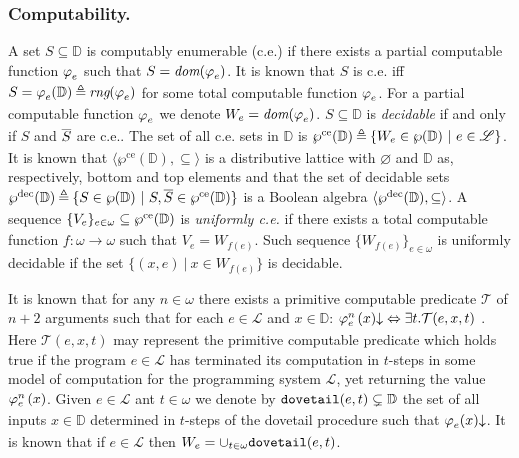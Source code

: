 \documentclass[runningheads]{llncs}
\def\ok#1{\mbox{\raisebox{0ex}[1ex][1ex]{$#1$}}}
\def\re{c.e.}
\def\wpre{\wp^{\text{ce}}}
\def\wprec{\wp^{\text{dec}}}
\def\dovetl{{\tt dovetail}}
\newcommand{\ccL}{\mathscr{L}}
\newcommand{\Domain}{\mathbb{D}}
\newcommand{\NF}{{\mathcal{T}}}
\newcommand{\pfunction}[3]{\ok{\varphi^{#2\, #3}_{#1}}}
\newcommand{\ptfunction}[5]{\ok{[\varphi^{#2 #3}_{#1}(#4)]^{#5}}}
\newcommand{\compl}[1]{\ok{\overline{#1}}}
\newcommand{\ra}{\rightarrow}
\newcommand{\range}{\textit{rng}}
\newcommand{\dom}{\textit{dom}}
\newcommand{\ud}{\ok{\:\triangleq\:}}
\def\ok#1{\mbox{\raisebox{0ex}[1ex][1ex]{$#1$}}}
\newcommand{\sset}[2]{\{#1  ~|~ #2\}}
\newcommand{\nat}{\omega}
\def\tuple#1{\langle #1 \rangle}
\begin{document}
\subsubsection{Computability.}
A set $S\subseteq \Domain$ is computably enumerable (\re) if there exists a partial computable function $\pfunction{e}{}{}$ such that $S=\dom(\pfunction{e}{}{})$. It is known that $S$ is {\re} iff $S = \pfunction{e}{}{}(\Domain)\ud\range(\pfunction{e}{}{})$ for some total computable function $\pfunction{e}{}{}$.
For a partial computable function $\pfunction{e}{}{}$ we denote $W_e = \dom(\pfunction{e}{}{})$. $S\subseteq \Domain$ is {\em decidable} if and only if $S$ and $\compl{S}$ are \re.
The set of all {\re} sets in $\Domain$ is $\wpre(\Domain)\ud \sset{W_e \in \wp(\Domain)}{e\in\ccL}$. 
It is known \cite[Union Theorem~1.9, Chapter~II]{soare} 
that $\tuple{\wpre(\Domain),\subseteq}$ is 
a distributive lattice with $\varnothing$ and $\Domain$ as, respectively, bottom and top elements and that
the set of decidable sets $\wprec(\Domain) \ud \sset{S\in \wp(\Domain)}{
S, \compl{S}\in \wpre(\Domain)}$
is a Boolean algebra $\ok{\tuple{\wprec(\Domain),\subseteq}}$. 
A sequence $\ok{\{V_e\}_{e\in\nat}\subseteq\wpre(\Domain)}$ is {\em uniformly {\re}} if there exists a total computable function $f:\nat\ra\nat$ such that $V_e=W_{f(e)}$. Such sequence $\{W_{f(e)}\}_{e\in\nat}$ is uniformly decidable if the set $\sset{(x,e)}{x\in W_{f(e)}}$ is decidable.

\smallskip

It is known that for any $n\in\nat$ there exists a primitive computable predicate $\NF$ of $n+2$ arguments such that 
for each $e\in\ccL$ and $x\in\Domain$: $\pfunction{e}{n}{}(x){\downarrow} \Leftrightarrow \exists t.\NF(e,x,t)$ \cite{kleene38}. Here $\NF(e,x,t)$ may represent the primitive computable predicate which holds true if the program $e\in\ccL$ has terminated its computation in $t$-steps in some model of computation for the programming system $\ccL$, yet returning the value $\pfunction{e}{n}{}(x)$. 
Given $e\in\ccL$ ant $t\in\omega$ we denote by $\dovetl(e,t)\subsetneq\Domain$ the 
set of all inputs $x\in \Domain$ determined in $t$-steps of the dovetail procedure such that $\pfunction{e}{}{}(x){\downarrow}$. It is known that if $e\in\ccL$ then $W_e=\cup_{t\in\omega}\dovetl(e,t)$.
\end{document}
